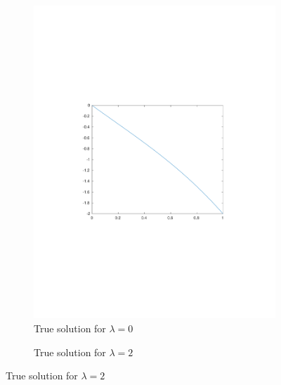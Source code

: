 \documentclass{article}
\begin{document}
\begin{figure}[H]
\begin{subfigure}{0.48\textwidth}
\caption{True solution for $\lambda = 0$}
\includegraphics[width=\linewidth]{truesolution_lambda_0}
\end{subfigure}\hspace*{\fill}
\begin{subfigure}{0.48\textwidth}
\caption{True solution for $\lambda = 2$}

\end{subfigure}
\end{figure}
\end{document}
